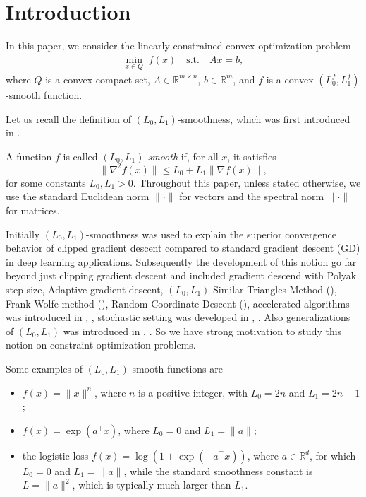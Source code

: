 \documentclass[runningheads]{llncs}
\begin{document}
	\section{Introduction}
	
	In this paper, we consider the linearly constrained convex optimization problem
	\begin{align}
		\min_{x \in Q} \; f(x)
		\quad \text{s.t.} \quad
		Ax=b,
		\label{eq:main_problem}
	\end{align}
	where $Q$ is a convex compact set, $A \in \mathbb{R}^{m \times n}$, $b \in \mathbb{R}^{m}$, and $f$ is a convex $(L_0^f,L_1^f)$-smooth function.
	
	Let us recall the definition of $(L_0,L_1)$-smoothness, which was first introduced in \cite{zhang2019gradient}.
	\begin{definition}
		A function $f$ is called \emph{$(L_0,L_1)$-smooth} if, for all $x$, it satisfies
		\begin{equation}\label{def:l0_l1_twice_dif}
			\| \nabla^2 f(x) \| \leq L_0 + L_1 \| \nabla f(x) \|,
		\end{equation}
		for some constants $L_0, L_1 > 0$. Throughout this paper, unless stated otherwise, we use the standard Euclidean norm $\|\cdot\|$ for vectors and the spectral norm $\|\cdot\|$ for matrices.
	\end{definition}
	
	Initially $(L_0,L_1)$-smoothness was used to explain the superior convergence behavior of clipped gradient descent compared to standard gradient descent (GD) in deep learning applications. Subsequently the development of this notion go far beyond just clipping gradient descent and included gradient descend with Polyak step size, Adaptive gradient descent, $(L_0, L_1)$-Similar Triangles Method (\cite{gorbunov2024methods}), Frank-Wolfe method (\cite{vyguzov2025frank}), Random Coordinate Descent (\cite{lobanov2024linear}),  accelerated algorithms was introduced in \cite{vankov2025optimizing}, \cite{tyurin2025near}, stochastic setting was developed in \cite{zhang2020improved}, \cite{koloskova2023revisiting}. Also generalizations of $(L_0, L_1)$ was introduced in \cite{li2023convex}, \cite{chen2023generalized}. So we have strong motivation to study this notion on constraint optimization problems.
	
	Some examples of $(L_0,L_1)$-smooth functions are 
	\begin{itemize}
		\item $f(x) = \|x\|^n$, where $n$ is a positive integer, with $L_0 = 2n$ and $L_1 = 2n - 1$;
		\item $f(x) = \exp(a^\top x)$, where $L_0 = 0$ and $L_1 = \|a\|$;
		\item the logistic loss $f(x) = \log(1 + \exp(-a^\top x))$, where $a \in \mathbb{R}^d$, for which $L_0 = 0$ and $L_1 = \|a\|$, while the standard smoothness constant is $L = \|a\|^2$, which is typically much larger than $L_1$.
	\end{itemize}
	
\end{document}
